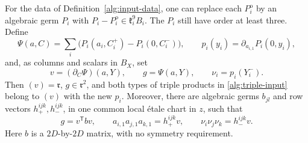 \begin{proposition}
\label{alg:replacement-preserves}
For the data of Definition~\ref{alg:input-data}, one can replace each
$P_i^{\mathrm{o}}$ by an algebraic germ $P_i$ with
$P_i-P_i^{\mathrm{o}}\in\mathfrak k_i^9B_i$. The $P_i$ still have order
at least three. Define
\[
 \Psi(a,C)=\sum_i\bigl(P_i(a_i,C_i^+)-P_i(0,C_i^-)\bigr),
 \qquad p_i(y_i)=\partial_{a_{i,1}}P_i(0,y_i),
\]
and, as columns and scalars in $B_X$, set
\[
 v=(\partial_C\Psi)(a,Y),\qquad g=\Psi(a,Y),
 \qquad \nu_i=p_i(Y_i^-).
\]
Then $(v)=\mathfrak r$, $g\in\mathfrak r^2$, and both types of triple
products in \eqref{alg:triple-input} belong to $(v)$ with the new
$p_i$. Moreover, there are algebraic germs $b_{jl}$ and row vectors
$h_+^{ijk},h_-^{ijk}$, in one common local \'etale chart in $z$,
such that
\begin{equation}
 g=v^{\mathsf T}bv,\qquad
 a_{i,1}a_{j,1}a_{k,1}=h_+^{ijk}v,\qquad
 \nu_i\nu_j\nu_k=h_-^{ijk}v.
 \label{alg:algebraic-witnesses}
\end{equation}
Here $b$ is a $2D$-by-$2D$ matrix, with no symmetry requirement.
\end{proposition}

